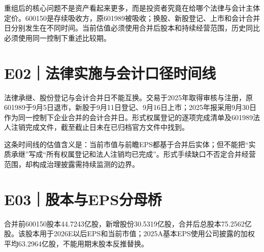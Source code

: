 重组后的核心问题不是资产看起来更多，而是投资者究竟在给哪个法律与会计主体定价。600150是存续吸收方，原601989被吸收；换股、新股登记、上市和会计合并日分别发生在不同时间。当前估值必须使用合并后股本和持续经营范围，历史同比必须使用同一控制下重述比较期。

\section{E02｜法律实施与会计口径时间线}

法律承继、股份登记与会计合并日不能互换。交易于2025年取得审核与注册，原601989于9月5日退市，新股于9月11日登记、9月16日上市；2025年报采用9月30日作为同一控制下企业合并的会计合并日。形式权属登记的逐项完成清单及601989法人注销完成文件，截至截止日未在已归档官方文件中找到。

\begin{exhibitbox}[吸收合并关键节点]
\centering
{}
\end{exhibitbox}

这条时间线的估值含义是：当前市值与前瞻EPS都基于合并后实体；但不能把“实质承继”写成“所有权属登记和法人注销均已完成”。形式手续缺口不否定合并经营范围，却构成治理披露需持续监测的边界。

\section{E03｜股本与EPS分母桥}

合并前600150股本44.7243亿股，新增股份30.5319亿股，合并后总股本75.2562亿股。该股本用于2026E以后EPS和当前市值；2025A基本EPS使用公司披露的加权平均63.2964亿股，不能用期末股本反推替换。

